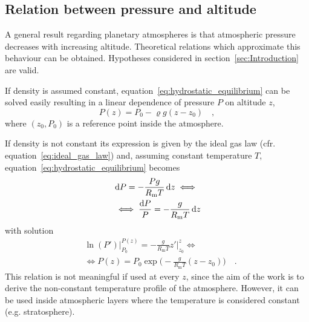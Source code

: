 \documentclass[a4paper,10pt,twocolumn,\classoptions]{article}
\begin{document}
\subsection{Relation between pressure and altitude}
\label{sec:Relation between pressure and altitude}
A general result regarding planetary atmospheres is that atmospheric pressure decreases with increasing altitude. Theoretical relations which approximate this behaviour can be obtained. Hypotheses considered in section~\ref{sec:Introduction} are valid.

If density is assumed constant, equation~\eqref{eq:hydrostatic_equilibrium} can be solved easily resulting in a linear dependence of pressure $P$ on altitude $z$,
\begin{equation}
  \label{eq:pressure_constant_density}
  P(z) = P_0 - \varrho g (z - z_0)
  \quad ,
\end{equation}
where $(z_0, P_0)$ is a reference point inside the atmosphere.

If density is not constant its expression is given by the ideal gas law (cfr. equation~\eqref{eq:ideal_gas_law}) and, assuming constant temperature $T$, equation~\eqref{eq:hydrostatic_equilibrium} becomes
\begin{equation}
  \label{eq:hydrostatic_equilibrium_ideal_gas_law_constant_temperature}
  \begin{split}
    & \odif{P} = - \frac{P g}{R_\text{m} T} \odif{z} \iff \\
    & \iff \frac{\odif{P}}{P} = - \frac{g}{R_\text{m} T} \odif{z}
  \end{split}
\end{equation}
with solution
\begin{equation}
  \label{eq:pressure_constant_temperature}
  \begin{split}
    & \ln(P') \bigg|_{P_0}^{P(z)} = - \frac{g}{R_\text{m} T} z' \bigg|_{z_0}^{z} \iff \\
    & \iff P(z) = P_0 \exp{\bigg( - \frac{g}{R_\text{m} T} (z - z_0) \bigg)}
    \quad .
  \end{split}
\end{equation}
This relation is not meaningful if used at every $z$, since the aim of the work is to derive the non-constant temperature profile of the atmosphere. However, it can be used inside atmospheric layers where the temperature is considered constant (e.g. stratosphere).
\end{document}
